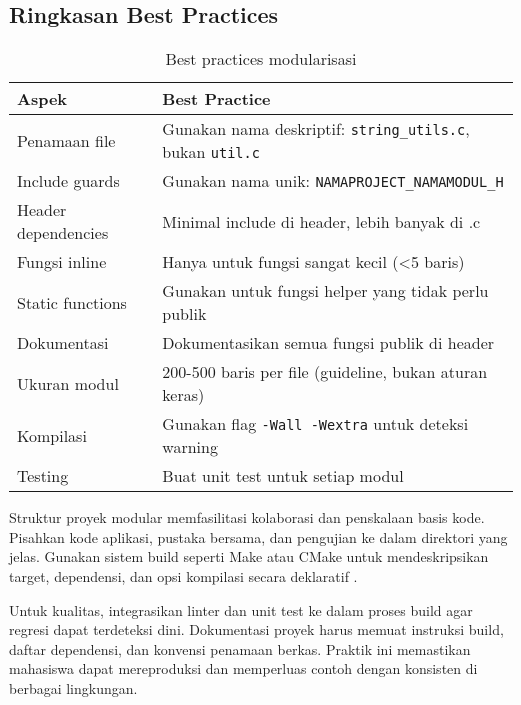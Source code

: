 \documentclass[../main.tex]{subfiles}
\begin{document}
\subsection{Ringkasan Best Practices}

\begin{table}[H]
\centering
\begin{tabular}{|l|p{10cm}|}
\hline
\textbf{Aspek} & \textbf{Best Practice} \\ \hline
Penamaan file & Gunakan nama deskriptif: \texttt{string\_utils.c}, bukan \texttt{util.c} \\ \hline
Include guards & Gunakan nama unik: \texttt{NAMAPROJECT\_NAMAMODUL\_H} \\ \hline
Header dependencies & Minimal include di header, lebih banyak di .c \\ \hline
Fungsi inline & Hanya untuk fungsi sangat kecil (\textless 5 baris) \\ \hline
Static functions & Gunakan untuk fungsi helper yang tidak perlu publik \\ \hline
Dokumentasi & Dokumentasikan semua fungsi publik di header \\ \hline
Ukuran modul & 200-500 baris per file (guideline, bukan aturan keras) \\ \hline
Kompilasi & Gunakan flag \texttt{-Wall -Wextra} untuk deteksi warning \\ \hline
Testing & Buat unit test untuk setiap modul \\ \hline
\end{tabular}
\caption{Best practices modularisasi}
\end{table}

Struktur proyek modular memfasilitasi kolaborasi dan penskalaan basis kode. Pisahkan kode aplikasi, pustaka bersama, dan pengujian ke dalam direktori yang jelas. Gunakan sistem build seperti Make atau CMake untuk mendeskripsikan target, dependensi, dan opsi kompilasi secara deklaratif \parencite{gnu-c-manual,cpp-reference}.

Untuk kualitas, integrasikan linter dan unit test ke dalam proses build agar regresi dapat terdeteksi dini. Dokumentasi proyek harus memuat instruksi build, daftar dependensi, dan konvensi penamaan berkas. Praktik ini memastikan mahasiswa dapat mereproduksi dan memperluas contoh dengan konsisten di berbagai lingkungan.
\end{document}
